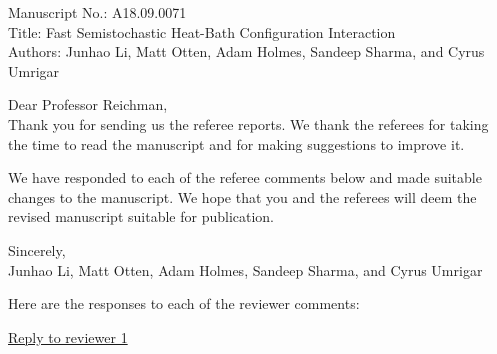 \documentclass[
preprint,
onecolumn,
 superscriptaddress,
 amsmath,amssymb,
 aps,
]{revtex4-1}
\begin{document}

\noindent Manuscript No.: A18.09.0071 \\
Title: Fast Semistochastic Heat-Bath Configuration Interaction \\
Authors: Junhao Li, Matt Otten, Adam Holmes, Sandeep Sharma, and Cyrus Umrigar
\vskip 8mm

\noindent Dear Professor Reichman, \\
Thank you for sending us the referee reports.  We thank the referees for taking the time to
read the manuscript
and for making suggestions to improve it.

We have responded to each of the referee comments below and made suitable changes to the
manuscript.
We hope that you and the referees will deem the revised manuscript suitable for publication.

\vskip 3mm
\noindent Sincerely,\\
Junhao Li, Matt Otten, Adam Holmes, Sandeep Sharma, and Cyrus Umrigar

\vskip 8mm

\noindent Here are the responses to each of the reviewer comments:

\noindent\underline{Reply to reviewer 1}
\end{document}
